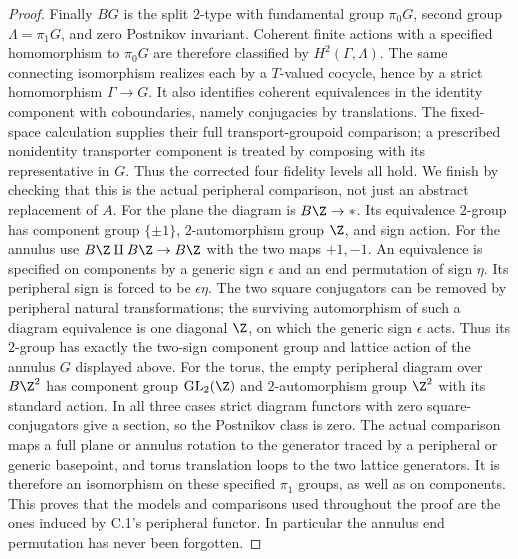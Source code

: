 \begin{proof}
Finally $BG$ is the split $2$-type with fundamental group
$\pi_0G$, second group $\Lambda=\pi_1G$, and zero Postnikov invariant.
Coherent finite actions with a specified homomorphism to $\pi_0G$ are
therefore classified by $H^2(\Gamma,\Lambda)$. The same connecting
isomorphism realizes each by a $T$-valued cocycle, hence by a strict
homomorphism $\Gamma\to G$. It also identifies coherent equivalences
in the identity component with coboundaries, namely conjugacies by
translations. The fixed-space calculation supplies their full
transport-groupoid comparison; a prescribed nonidentity transporter
component is treated by composing with its representative in $G$.
Thus the corrected four fidelity levels all hold. We finish by checking
that this is the actual peripheral comparison, not just an abstract
replacement of $A$. For the plane the diagram is $B\Z\to *$.
Its equivalence $2$-group has component group $\{\pm1\}$,
$2$-automorphism group $\Z$, and sign action. For the annulus use
$B\Z\amalg B\Z\to B\Z$ with the two maps $+1,-1$.
An equivalence is specified on components by a generic sign $\epsilon$
and an end permutation of sign $\eta$. Its peripheral sign is forced
to be $\epsilon\eta$. The two square conjugators can be removed by
peripheral natural transformations; the surviving automorphism of
such a diagram equivalence is one diagonal $\Z$, on which the generic
sign $\epsilon$ acts. Thus its $2$-group has exactly the two-sign
component group and lattice action of the annulus $G$ displayed above.
For the torus, the empty peripheral diagram over $B\Z^2$ has
component group $\operatorname{GL}_2(\Z)$ and $2$-automorphism group
$\Z^2$ with its standard action. In all three cases strict diagram
functors with zero square-conjugators give a section, so the
Postnikov class is zero. The actual comparison maps a full plane or
annulus rotation to the generator traced by a peripheral or generic
basepoint, and torus translation loops to the two lattice generators.
It is therefore an isomorphism on these specified $\pi_1$ groups,
as well as on components. This proves that the models and comparisons
used throughout the proof are the ones induced by C.1's peripheral
functor. In particular the annulus end permutation has never been
forgotten.
\end{proof}

